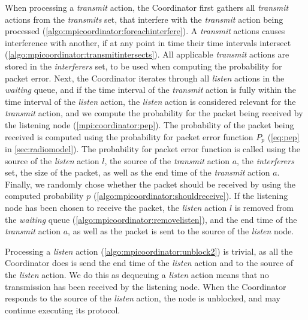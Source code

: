 When processing a \textit{transmit} action, the Coordinator first gathers all \textit{transmit} actions from
the \textit{transmits} set, that interfere with the \textit{transmit} action being processed
(\autoref{algo:mpicoordinator:foreachinterfere}). A \textit{transmit} actions causes interference with
another, if at any point in time their time intervals intersect
(\autoref{algo:mpicoordinator:transmitintersects}). All applicable \textit{transmit} actions are stored in the
\textit{interferers} set, to be used when computing the probability for packet error. Next, the Coordinator
iterates through all \textit{listen} actions in the \textit{waiting} queue, and if the time interval of the
\textit{transmit} action is fully within the time interval of the \textit{listen} action, the \textit{listen}
action is considered relevant for the \textit{transmit} action, and we compute the probability for the packet
being received by the listening node (\autoref{mpi:coordinator:pep}). The probability of the packet being
received is computed using the probability for packet error function $P_p$ (\autoref{eq:pep} in
\autoref{sec:radiomodel}). The probability for packet error function is called using the source of the
\textit{listen} action $l$, the source of the \textit{transmit} action $a$, the \textit{interferers} set, the
size of the packet, as well as the end time of the \textit{transmit} action $a$. Finally, we randomly chose
whether the packet should be received by using the computed probability $p$
(\autoref{algo:mpicoordinator:shouldreceive}). If the listening node has been chosen to receive the packet,
the \textit{listen} action $l$ is removed from the \textit{waiting} queue
(\autoref{algo:mpicoordinator:removelisten}), and the end time of the \textit{transmit} action $a$, as well as
the packet is sent to the source of the \textit{listen} node. \medbreak

Processing a \textit{listen} action (\autoref{algo:mpicoordinator:unblock2}) is trivial, as all the
Coordinator does is send the end time of the \textit{listen} action and \KwNull to the source of the
\textit{listen} action. We do this as dequeuing a \textit{listen} action means that no transmission has been
received by the listening node. When the Coordinator responds to the source of the \textit{listen} action,
the node is unblocked, and may continue executing its protocol. \medbreak

